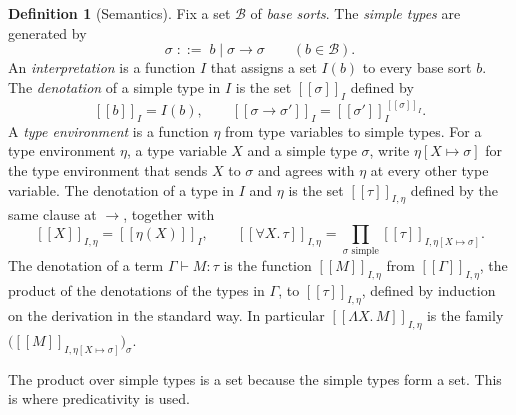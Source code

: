 \documentclass[11pt,a4paper]{report}
\theoremstyle{plain}
\theoremstyle{definition}
\newtheorem{definition}[theorem]{Definition}
\theoremstyle{remark}
\newcommand{\den}[2]{[\![#1]\!]_{#2}}
\begin{document}
\begin{definition}[Semantics]
\label{def:semantics}
Fix a set $\mathcal{B}$ of \emph{base sorts}. The \emph{simple types}
are generated by
\[
  \sigma \;::=\; b \mid \sigma \to \sigma \qquad (b \in \mathcal{B}).
\]
An \emph{interpretation} is a function $I$ that assigns a set $I(b)$ to every base
sort $b$. The \emph{denotation} of a simple type in $I$ is the set
$\den{\sigma}{I}$ defined by
\[
  \den{b}{I} = I(b) ,
  \qquad
  \den{\sigma \to \sigma'}{I} = \den{\sigma'}{I}^{\,\den{\sigma}{I}} .
\]
A \emph{type environment} is a function $\eta$ from type variables to simple
types. For a type environment $\eta$, a type variable $X$ and a simple type
$\sigma$, write $\eta[X \mapsto \sigma]$ for the type environment that sends $X$ to
$\sigma$ and agrees with $\eta$ at every other type variable. The denotation of a type in $I$ and $\eta$ is the set
$\den{\tau}{I,\eta}$ defined by the same clause at $\to$, together with
\[
  \den{X}{I,\eta} = \den{\eta(X)}{I} ,
  \qquad
  \den{\forall X.\, \tau}{I,\eta}
    = \prod_{\sigma \text{ simple}} \den{\tau}{I,\eta[X \mapsto \sigma]} .
\]
The denotation of a term $\Gamma \vdash M : \tau$ is the function
$\den{M}{I,\eta}$ from $\den{\Gamma}{I,\eta}$, the product of the denotations of
the types in $\Gamma$, to $\den{\tau}{I,\eta}$, defined by induction on the
derivation in the standard way. In particular $\den{\Lambda X.\, M}{I,\eta}$ is
the family
$\bigl(\den{M}{I,\eta[X \mapsto \sigma]}\bigr)_{\sigma}$.
\end{definition}

The product over simple types is a set because the simple types form a set. This
is where predicativity is used.
\end{document}
